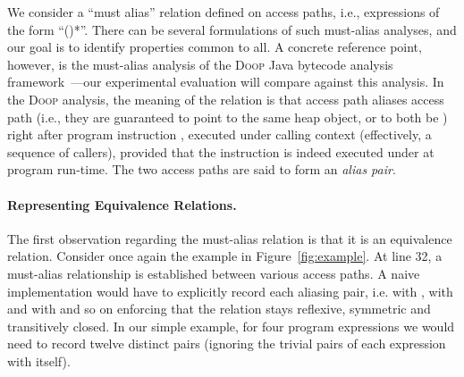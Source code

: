 
We consider a ``must alias'' relation defined on access paths, i.e.,
expressions of the form ``()*''. There can be several
formulations of such must-alias analyses, and our goal is to identify
properties common to all. A concrete reference point, however, is the
must-alias analysis of the \textsc{Doop} Java bytecode analysis
framework~\cite{soap/Balatsouras17}---our experimental evaluation will
compare against this analysis. In the \textsc{Doop} analysis, the
meaning of the  relation is that
access path  aliases access path  (i.e., they are
guaranteed to point to the same heap object, or to both be )
right after program instruction , executed under calling
context  (effectively, a sequence of callers), provided that
the instruction is indeed executed under  at program
run-time. The two access paths are said to form an \emph{alias pair}.


\paragraph{Representing Equivalence Relations.} The first observation regarding
the must-alias relation is that it is an equivalence relation. Consider once
again the example in Figure~\ref{fig:example}. At line 32, a must-alias
relationship is established between various access paths. A naive
implementation would have to explicitly record each aliasing pair, i.e.
 with , with  and with 
and so on enforcing that the relation stays reflexive, symmetric and
transitively closed.  In our simple example, for four program expressions we
would need to record twelve distinct pairs (ignoring the trivial pairs of each
expression with itself).

